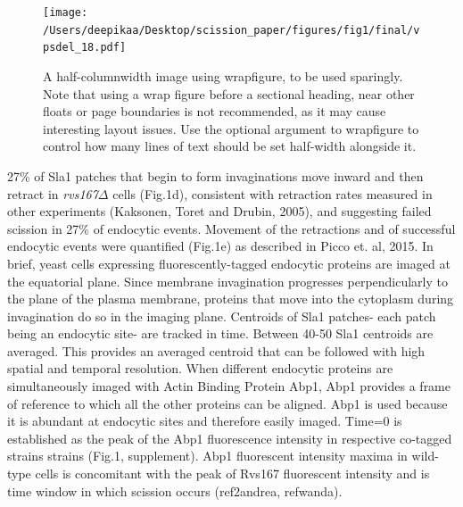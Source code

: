 \documentclass[9pt,lineno]{elife}
\begin{document}
\begin{figure}[h]
	\texttt{[image: /Users/deepikaa/Desktop/scission\_paper/figures/fig1/final/vpsdel\_18.pdf]}
	\caption{A half-columnwidth image using wrapfigure, to be used sparingly. Note that using a wrap figure before a sectional heading, near other floats or page boundaries is not recommended, as it may cause interesting layout issues. Use the optional argument to wrapfigure to control how many lines of text should be set half-width alongside it.}
	\label{fig:halfwidth}
\end{figure}

27\% of Sla1 patches that begin to form invaginations move inward and then retract in \textit{rvs167$\Delta$} cells (Fig.1d), consistent with retraction rates measured in other experiments (Kaksonen, Toret and Drubin, 2005), and suggesting failed scission in 27\% of endocytic events. Movement of the retractions and of successful endocytic events were quantified (Fig.1e) as described in Picco et. al, 2015. In brief, yeast cells expressing fluorescently-tagged endocytic proteins are imaged at the equatorial plane. Since membrane invagination progresses perpendicularly to the plane of the plasma membrane, proteins that move into the cytoplasm during invagination do so in the imaging plane. Centroids of Sla1 patches- each patch being an endocytic site- are tracked in time. Between 40-50 Sla1 centroids are averaged. This provides an averaged centroid that can be followed with high spatial and temporal resolution. When different endocytic proteins are simultaneously imaged with Actin Binding Protein Abp1, Abp1 provides a frame of reference to which all the other proteins can be aligned. Abp1 is used because it is abundant at endocytic sites and therefore easily imaged. Time=0 is established as the peak of the Abp1 fluorescence intensity in respective co-tagged strains strains (Fig.1, supplement). Abp1 fluorescent intensity maxima in wild-type cells is concomitant with the peak of Rvs167 fluorescent intensity and is time window in which scission occurs (ref2andrea, refwanda). 
\end{document}
